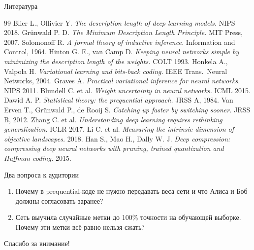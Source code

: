\documentclass[aspectratio=169,10pt]{beamer}
\begin{document}
\begin{frame}{Литература}
  \scriptsize
  \begin{thebibliography}{99}
     Blier L., Ollivier Y. \emph{The description length of deep learning models.} NIPS 2018.
     Grünwald P. D. \emph{The Minimum Description Length Principle.} MIT Press, 2007.
     Solomonoff R. \emph{A formal theory of inductive inference.} Information and Control, 1964.
     Hinton G. E., van Camp D. \emph{Keeping neural networks simple by minimizing the description length of the weights.} COLT 1993.
     Honkela A., Valpola H. \emph{Variational learning and bits-back coding.} IEEE Trans.\ Neural Networks, 2004.
     Graves A. \emph{Practical variational inference for neural networks.} NIPS 2011.
     Blundell C. et al. \emph{Weight uncertainty in neural networks.} ICML 2015.
     Dawid A. P. \emph{Statistical theory: the prequential approach.} JRSS A, 1984.
     Van Erven T., Grünwald P., de Rooij S. \emph{Catching up faster by switching sooner.} JRSS B, 2012.
     Zhang C. et al. \emph{Understanding deep learning requires rethinking generalization.} ICLR 2017.
     Li C. et al. \emph{Measuring the intrinsic dimension of objective landscapes.} 2018.
     Han S., Mao H., Dally W. J. \emph{Deep compression: compressing deep neural networks with pruning, trained quantization and Huffman coding.} 2015.
  \end{thebibliography}
\end{frame}

\begin{frame}{Два вопроса к аудитории}
  \begin{enumerate}
    \setlength{\itemsep}{1.2em}
    \item Почему в prequential-коде не нужно передавать веса сети и что Алиса и Боб должны согласовать заранее?
    \item Сеть выучила случайные метки до 100\% точности на обучающей выборке. Почему эти метки всё равно нельзя сжать?
  \end{enumerate}
  \vfill
  \centering\Large Спасибо за внимание!
\end{frame}
\end{document}
